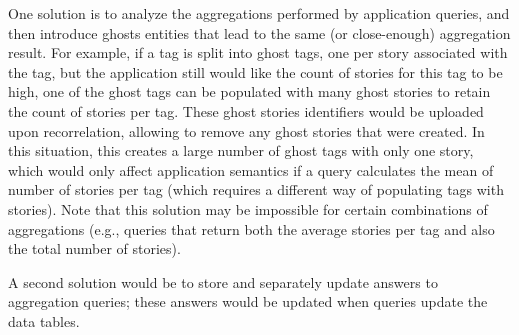 One solution is to analyze the aggregations performed by application queries, and then
introduce ghosts entities that lead to the same (or close-enough) aggregation result. For example,
if a tag is split into ghost tags, one per story associated with the tag, but the application still
would like the count of stories for this tag to be high, one of the ghost tags can be populated with
many ghost stories to retain the count of stories per tag. These ghost stories identifiers would be
uploaded upon recorrelation, allowing \sys{} to remove any ghost stories that were created. In this
situation, this creates a large number of ghost tags with only one story, which would only affect
application semantics if a query calculates the mean of number of stories per tag (which requires a
different way of populating tags with stories). Note that this solution may be impossible for  
certain combinations of aggregations (e.g., queries that return both the average stories per tag and also
the total number of stories).

A second solution would be to store and separately update answers to aggregation queries;
these answers would be updated when queries update the data tables.

